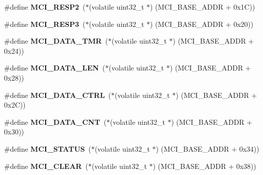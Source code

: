 \begin{DoxyCompactItemize}
\#define {\bfseries M\+C\+I\+\_\+\+R\+E\+S\+P2}~($\ast$(volatile uint32\+\_\+t $\ast$) (M\+C\+I\+\_\+\+B\+A\+S\+E\+\_\+\+A\+D\+DR + 0x1\+C))
\item 
\mbox{\label{group__lpc24xx__regs_ga348cc29a8e8665388dbc815f0551af0c}} 
\#define {\bfseries M\+C\+I\+\_\+\+R\+E\+S\+P3}~($\ast$(volatile uint32\+\_\+t $\ast$) (M\+C\+I\+\_\+\+B\+A\+S\+E\+\_\+\+A\+D\+DR + 0x20))
\item 
\mbox{\label{group__lpc24xx__regs_gaf98729f3594c985e678f2863c1f6479d}} 
\#define {\bfseries M\+C\+I\+\_\+\+D\+A\+T\+A\+\_\+\+T\+MR}~($\ast$(volatile uint32\+\_\+t $\ast$) (M\+C\+I\+\_\+\+B\+A\+S\+E\+\_\+\+A\+D\+DR + 0x24))
\item 
\mbox{\label{group__lpc24xx__regs_ga99a039689d99c83eb0b21b7194b56136}} 
\#define {\bfseries M\+C\+I\+\_\+\+D\+A\+T\+A\+\_\+\+L\+EN}~($\ast$(volatile uint32\+\_\+t $\ast$) (M\+C\+I\+\_\+\+B\+A\+S\+E\+\_\+\+A\+D\+DR + 0x28))
\item 
\mbox{\label{group__lpc24xx__regs_ga4f78b8217df9aefd504bedba8343e54e}} 
\#define {\bfseries M\+C\+I\+\_\+\+D\+A\+T\+A\+\_\+\+C\+T\+RL}~($\ast$(volatile uint32\+\_\+t $\ast$) (M\+C\+I\+\_\+\+B\+A\+S\+E\+\_\+\+A\+D\+DR + 0x2\+C))
\item 
\mbox{\label{group__lpc24xx__regs_gadd48d8f5510106dfa4581c52dc9165cc}} 
\#define {\bfseries M\+C\+I\+\_\+\+D\+A\+T\+A\+\_\+\+C\+NT}~($\ast$(volatile uint32\+\_\+t $\ast$) (M\+C\+I\+\_\+\+B\+A\+S\+E\+\_\+\+A\+D\+DR + 0x30))
\item 
\mbox{\label{group__lpc24xx__regs_ga4a04c8f2f9d2c7746623911ed7b85e01}} 
\#define {\bfseries M\+C\+I\+\_\+\+S\+T\+A\+T\+US}~($\ast$(volatile uint32\+\_\+t $\ast$) (M\+C\+I\+\_\+\+B\+A\+S\+E\+\_\+\+A\+D\+DR + 0x34))
\item 
\mbox{\label{group__lpc24xx__regs_ga3d589ab9ce9b6d04204c6d9fbcb0b2c3}} 
\#define {\bfseries M\+C\+I\+\_\+\+C\+L\+E\+AR}~($\ast$(volatile uint32\+\_\+t $\ast$) (M\+C\+I\+\_\+\+B\+A\+S\+E\+\_\+\+A\+D\+DR + 0x38))
\item 
\mbox{\label{group__lpc24xx__regs_ga25165d14d8d681ad4d3dc5dff1dd2f89}} 

\end{DoxyCompactItemize}
